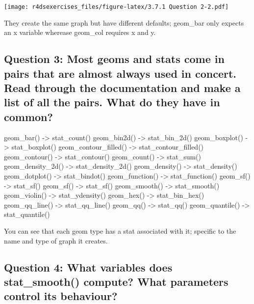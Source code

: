 \documentclass[
]{book}
\begin{document}
\texttt{[image: r4dsexercises\_files/figure-latex/3.7.1 Question 2-2.pdf]}

They create the same graph but have different defaults; geom\_bar only expects an x variable wherease geom\_col requires x and y.

\hypertarget{question-3-most-geoms-and-stats-come-in-pairs-that-are-almost-always-used-in-concert.-read-through-the-documentation-and-make-a-list-of-all-the-pairs.-what-do-they-have-in-common}{%
\subsection{Question 3: Most geoms and stats come in pairs that are almost always used in concert. Read through the documentation and make a list of all the pairs. What do they have in common?}\label{question-3-most-geoms-and-stats-come-in-pairs-that-are-almost-always-used-in-concert.-read-through-the-documentation-and-make-a-list-of-all-the-pairs.-what-do-they-have-in-common}}

geom\_bar() -\textgreater{} stat\_count()
geom\_bin2d() -\textgreater{} stat\_bin\_2d()
geom\_boxplot() -\textgreater{} stat\_boxplot()
geom\_contour\_filled() -\textgreater{} stat\_contour\_filled()
geom\_contour() -\textgreater{} stat\_contour()
geom\_count() -\textgreater{} stat\_sum()
geom\_density\_2d() -\textgreater{} stat\_density\_2d()
geom\_density() -\textgreater{} stat\_density()
geom\_dotplot() -\textgreater{} stat\_bindot()
geom\_function() -\textgreater{} stat\_function()
geom\_sf() -\textgreater{} stat\_sf()
geom\_sf() -\textgreater{} stat\_sf()
geom\_smooth() -\textgreater{} stat\_smooth()
geom\_violin() -\textgreater{} stat\_ydensity()
geom\_hex() -\textgreater{} stat\_bin\_hex()
geom\_qq\_line() -\textgreater{} stat\_qq\_line()
geom\_qq() -\textgreater{} stat\_qq()
geom\_quantile() -\textgreater{} stat\_quantile()

You can see that each geom type has a stat associated with it; specific to the name and type of graph it creates.

\hypertarget{question-4-what-variables-does-stat_smooth-compute-what-parameters-control-its-behaviour}{%
\subsection{Question 4: What variables does stat\_smooth() compute? What parameters control its behaviour?}\label{question-4-what-variables-does-stat_smooth-compute-what-parameters-control-its-behaviour}}
\end{document}
